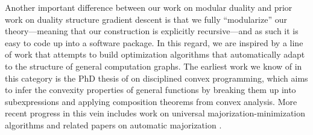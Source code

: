 Another important difference between our work on modular duality and prior work on duality structure gradient descent is that we fully ``modularize'' our theory---meaning that our construction is explicitly recursive---and as such it is easy to code up into a software package. In this regard, we are inspired by a line of work that attempts to build optimization algorithms that automatically adapt to the structure of general computation graphs. The earliest work we know of in this category is the PhD thesis of \citet{Grant2004} on disciplined convex programming, which aims to infer the convexity properties of general functions by breaking them up into subexpressions and applying composition theorems from convex analysis. More recent progress in this vein includes work on universal majorization-minimization algorithms \citep{Streeter2022AutomaticallyBT,streeter2023universal} and related papers on automatic majorization \citep{Tran2015FastDT,agd-2023}.

